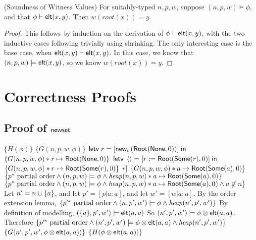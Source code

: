 \begin{lemma}{(Soundness of Witness Values)}
For suitably-typed $n, p, w$, suppose $(n, p, w) \models \phi$, and that ${\phi} \vdash \mathsf{elt}({x}, {y})$. Then $w(\mathit{root}(x)) = y$.  
\end{lemma}
\begin{proof}
This follows by induction on the derivation of
${\phi} \vdash \mathsf{elt}({x}, {y})$, with the two inductive cases following
trivially using shrinking. The only interesting case is the base case,
when ${\mathsf{elt}({x}, {y})} \vdash \mathsf{elt}({x}, {y})$.  In this case, we know that $(n,
p, w) \models \mathsf{elt}({x}, {y})$, so we know $w(\mathit{root}(x)) = y$. 


\end{proof}

\section{Correctness Proofs}

\subsection{Proof of $\mathsf{newset}$}

\begin{specification}
\nextline $\{H(\phi)\}$
\nextline $\{G(n, p, w, \phi)\}$
\nextline $\mathsf{letv}\;r = [\mathsf{new}_{\sigma}(\mathsf{Root}(\mathsf{None}, 0))]\;\mathsf{in}\;$
\nextline $\{G(n, p, w, \phi) * r \mapsto \mathsf{Root}(\mathsf{None}, 0)\}$
\nextline $\mathsf{letv}\;\left<\right> = [r := \mathsf{Root}(\mathsf{Some}(r), 0)]\;\mathsf{in}\;$
\nextline $\{G(n, p, w, \phi) * r \mapsto \mathsf{Root}(\mathsf{Some}(r), 0)\}$
\nextline $r]$
\nextline $\{G(n, p, w, \phi) * a \mapsto \mathsf{Root}(\mathsf{Some}(a), 0)\}$
\nextline $\{p^{*} \mbox{ partial order} \land (n, p, w) \models \phi \land
             \mathit{heap}(n, p, w) * a \mapsto \mathsf{Root}(\mathsf{Some}(a), 0)\}$
\nextline $\{p^{*} \mbox{ partial order} \land (n, p, w) \models \phi \land
             \mathit{heap}(n, p, w) * a \mapsto \mathsf{Root}(\mathsf{Some}(a), 0) \land a \not\in n\}$
\nextline Let $n' = n \cup \{{a}\}$, and let $p' = [p|a:a]$, and let $w' = [w|a:a]$. 
\nextline By the order extension lemma,
\nextline $\{p'^{*} \mbox{ partial order} \land (n, p', w') \models \phi \land
             \mathit{heap}(n', p', w')\}$
\nextline By definition of modelling, $(\{{a}\}, p', w') \models \mathsf{elt}({a}, {a})$
\nextline So $(n', p', w') \models \phi \otimes \mathsf{elt}({a}, {a})$. Therefore
\nextline $\{p'^{*} \mbox{ partial order} \land (n', p', w') \models \phi \otimes \mathsf{elt}({a}, {a}) \land \mathit{heap}(n', p', w')\}$
\nextline $\{G(n', p', w', \phi \otimes \mathsf{elt}({a}, {a}))\}$
\nextline $\{H(\phi \otimes \mathsf{elt}({a}, {a}))\}$
\end{specification}

